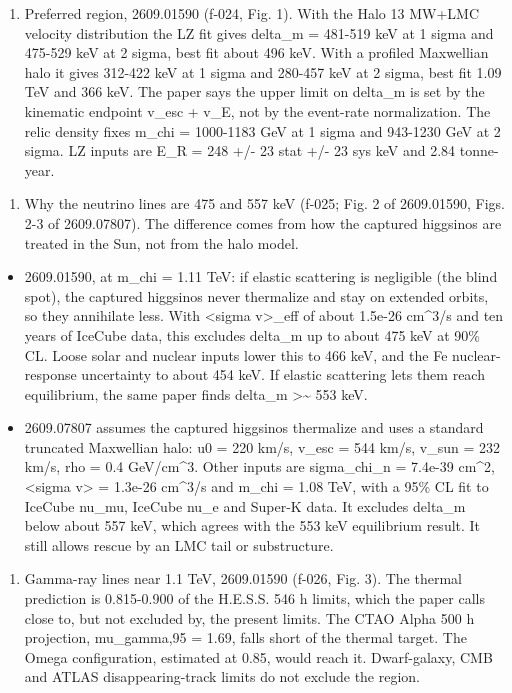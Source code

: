 \documentclass[11pt,a4paper]{article}
\begin{document}
\begin{enumerate}
  \item Preferred region, 2609.01590 (f-024, Fig. 1). With the Halo 13 MW+LMC velocity distribution the LZ fit gives delta\_m = 481-519 keV at 1 sigma and 475-529 keV at 2 sigma, best fit about 496 keV. With a profiled Maxwellian halo it gives 312-422 keV at 1 sigma and 280-457 keV at 2 sigma, best fit 1.09 TeV and 366 keV. The paper says the upper limit on delta\_m is set by the kinematic endpoint v\_esc + v\_E, not by the event-rate normalization. The relic density fixes m\_chi = 1000-1183 GeV at 1 sigma and 943-1230 GeV at 2 sigma. LZ inputs are E\_R = 248 +/- 23 stat +/- 23 sys keV and 2.84 tonne-year.
\end{enumerate}
\begin{enumerate}
  \item Why the neutrino lines are 475 and 557 keV (f-025; Fig. 2 of 2609.01590, Figs. 2-3 of 2609.07807). The difference comes from how the captured higgsinos are treated in the Sun, not from the halo model.
\end{enumerate}
\begin{itemize}
  \item 2609.01590, at m\_chi = 1.11 TeV: if elastic scattering is negligible (the blind spot), the captured higgsinos never thermalize and stay on extended orbits, so they annihilate less. With \textless{}sigma v\textgreater{}\_eff of about 1.5e-26 cm\textasciicircum{}3/s and ten years of IceCube data, this excludes delta\_m up to about 475 keV at 90\% CL. Loose solar and nuclear inputs lower this to 466 keV, and the Fe nuclear-response uncertainty to about 454 keV. If elastic scattering lets them reach equilibrium, the same paper finds delta\_m \textgreater{}\textasciitilde{} 553 keV.
  \item 2609.07807 assumes the captured higgsinos thermalize and uses a standard truncated Maxwellian halo: u0 = 220 km/s, v\_esc = 544 km/s, v\_sun = 232 km/s, rho = 0.4 GeV/cm\textasciicircum{}3. Other inputs are sigma\_chi\_n = 7.4e-39 cm\textasciicircum{}2, \textless{}sigma v\textgreater{} = 1.3e-26 cm\textasciicircum{}3/s and m\_chi = 1.08 TeV, with a 95\% CL fit to IceCube nu\_mu, IceCube nu\_e and Super-K data. It excludes delta\_m below about 557 keV, which agrees with the 553 keV equilibrium result. It still allows rescue by an LMC tail or substructure.
\end{itemize}
\begin{enumerate}
  \item Gamma-ray lines near 1.1 TeV, 2609.01590 (f-026, Fig. 3). The thermal prediction is 0.815-0.900 of the H.E.S.S. 546 h limits, which the paper calls close to, but not excluded by, the present limits. The CTAO Alpha 500 h projection, mu\_gamma,95 = 1.69, falls short of the thermal target. The Omega configuration, estimated at 0.85, would reach it. Dwarf-galaxy, CMB and ATLAS disappearing-track limits do not exclude the region.
\end{enumerate}
\end{document}
